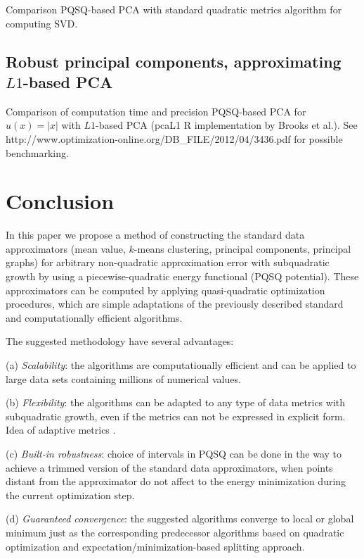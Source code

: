 \documentclass[preprint,12pt]{elsarticle}
\begin{document}
Comparison PQSQ-based PCA with standard quadratic metrics algorithm for computing SVD.

\subsection{Robust principal components, approximating $L1$-based PCA}

Comparison of computation time and precision PQSQ-based PCA for $u(x)=|x|$ with $L1$-based PCA (pcaL1 R implementation by Brooks et al.). See
http://www.optimization-online.org/DB\_FILE/2012/04/3436.pdf for possible benchmarking.




\section{Conclusion}

In this paper we propose a method of constructing the standard data approximators (mean value, $k$-means clustering, principal components, principal graphs)
for arbitrary non-quadratic approximation error with subquadratic growth by using a piecewise-quadratic energy functional (PQSQ potential). These approximators can be computed
by applying quasi-quadratic optimization procedures, which are simple adaptations of the previously described standard and computationally efficient algorithms.

The suggested methodology have several advantages:

(a) \textit{Scalability}: the algorithms are computationally efficient and can be applied to large data sets containing millions of numerical values.

(b) \textit{Flexibility}: the algorithms can be adapted to any type of data metrics with subquadratic growth, even if the metrics can not be expressed in explicit form. Idea of adaptive metrics \cite{Yang2006, Wu2009}.

(c) \textit{Built-in robustness}: choice of intervals in PQSQ can be done in the way to achieve a trimmed version of the standard data approximators, when points distant from the approximator do not affect to the energy minimization during the current optimization step.

(d) \textit{Guaranteed convergence}: the suggested algorithms converge to local or global minimum just as the corresponding predecessor algorithms based on quadratic optimization and expectation/minimization-based splitting approach.
\end{document}
